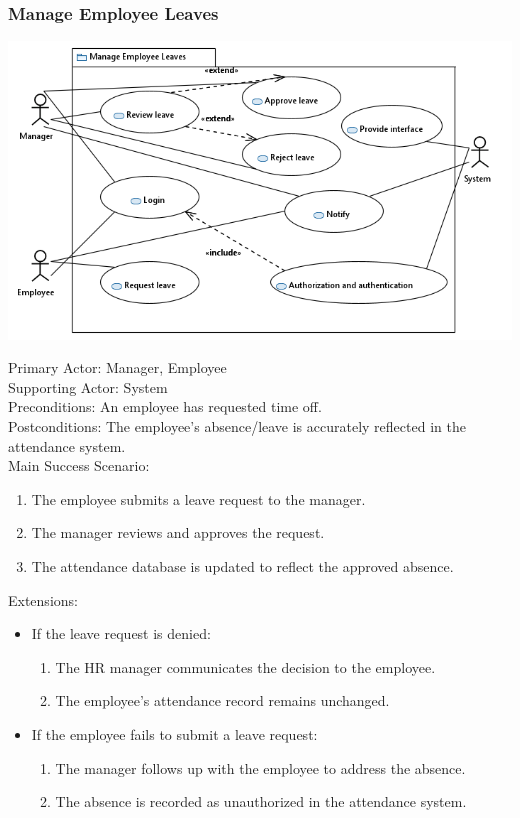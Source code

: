 \documentclass[a4paper, 12pt]{article}
\begin{document}
\subsubsection{Manage Employee Leaves}
\begin{center}
\includegraphics[width=1\textwidth]{Manage_Employee_Leaves_Use_Case.PNG}\par
\end{center}
Primary Actor: Manager, Employee\\
Supporting Actor: System\\
Preconditions: An employee has requested time off.\\
Postconditions: The employee's absence/leave is accurately reflected in the attendance system.\\
\newpage
Main Success Scenario:
\begin{enumerate}
    \item The employee submits a leave request to the manager.
    \item The manager reviews and approves the request.
    \item The attendance database is updated to reflect the approved absence.
\end{enumerate}
Extensions:
\begin{itemize}
    \item If the leave request is denied:
    \begin{enumerate}
        \item The HR manager communicates the decision to the employee.
        \item The employee's attendance record remains unchanged.
    \end{enumerate}
    \item If the employee fails to submit a leave request:
    \begin{enumerate}
        \item The manager follows up with the employee to address the absence.
        \item The absence is recorded as unauthorized in the attendance system.
    \end{enumerate}
\end{itemize}
\end{document}
